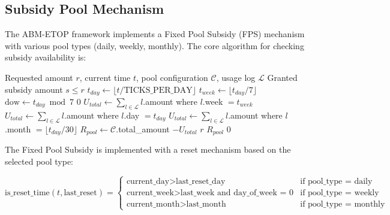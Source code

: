 \subsection{Subsidy Pool Mechanism}
The ABM-ETOP framework implements a Fixed Pool Subsidy (FPS) mechanism with various pool types (daily, weekly, monthly). The core algorithm for checking subsidy availability is:

\begin{algorithm}
\caption{Fixed Pool Subsidy Allocation}
\label{alg:subsidy-allocation}
\begin{algorithmic}[1]
\Require Requested amount $r$, current time $t$, pool configuration $\mathcal{C}$, usage log $\mathcal{L}$
\Ensure Granted subsidy amount $s \leq r$
\State $t_{day} \gets \lfloor t / \text{TICKS\_PER\_DAY} \rfloor$
\State $t_{week} \gets \lfloor t_{day} / 7 \rfloor$
\State $\text{dow} \gets t_{day} \bmod 7$
 
    \State \Return $0$
\EndIf
{}
    \State $U_{total} \gets \sum_{l \in \mathcal{L}} l$.amount where $l$.week $= t_{week}$
    \State $U_{total} \gets \sum_{l \in \mathcal{L}} l$.amount where $l$.day $= t_{day}$
    \State $U_{total} \gets \sum_{l \in \mathcal{L}} l$.amount where $l$.month $= \lfloor t_{day} / 30 \rfloor$
\EndIf
\State $R_{pool} \gets \mathcal{C}$.total\_amount $- U_{total}$
    \State \Return $r$ 
    \State \Return $R_{pool}$ 
\Else
    \State \Return $0$ 
\EndIf
\end{algorithmic}
\end{algorithm}

The Fixed Pool Subsidy is implemented with a reset mechanism based on the selected pool type:

\begin{equation}
\text{is\_reset\_time}(t, \text{last\_reset}) = 
\begin{cases}
\text{current\_day} > \text{last\_reset\_day} & \text{if pool\_type = daily} \\
\text{current\_week} > \text{last\_week} \text{ and day\_of\_week = 0} & \text{if pool\_type = weekly} \\
\text{current\_month} > \text{last\_month} & \text{if pool\_type = monthly}
\end{cases}
\end{equation}

